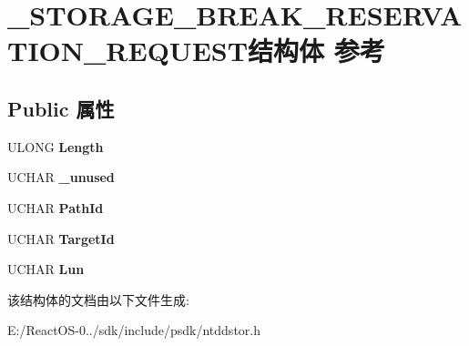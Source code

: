 \hypertarget{struct___s_t_o_r_a_g_e___b_r_e_a_k___r_e_s_e_r_v_a_t_i_o_n___r_e_q_u_e_s_t}{}\section{\+\_\+\+S\+T\+O\+R\+A\+G\+E\+\_\+\+B\+R\+E\+A\+K\+\_\+\+R\+E\+S\+E\+R\+V\+A\+T\+I\+O\+N\+\_\+\+R\+E\+Q\+U\+E\+S\+T结构体 参考}
\label{struct___s_t_o_r_a_g_e___b_r_e_a_k___r_e_s_e_r_v_a_t_i_o_n___r_e_q_u_e_s_t}
\subsection*{Public 属性}
\begin{DoxyCompactItemize}
\item 
\mbox{\label{struct___s_t_o_r_a_g_e___b_r_e_a_k___r_e_s_e_r_v_a_t_i_o_n___r_e_q_u_e_s_t_a73fdee5af86956c812d6cf01e4f4e825}} 
U\+L\+O\+NG {\bfseries Length}
\item 
\mbox{\label{struct___s_t_o_r_a_g_e___b_r_e_a_k___r_e_s_e_r_v_a_t_i_o_n___r_e_q_u_e_s_t_aef04a947c50e5e9fd005708970862bb2}} 
U\+C\+H\+AR {\bfseries \+\_\+unused}
\item 
\mbox{\label{struct___s_t_o_r_a_g_e___b_r_e_a_k___r_e_s_e_r_v_a_t_i_o_n___r_e_q_u_e_s_t_a59a789d1ec44caf17e56eb0f9841a06e}} 
U\+C\+H\+AR {\bfseries Path\+Id}
\item 
\mbox{\label{struct___s_t_o_r_a_g_e___b_r_e_a_k___r_e_s_e_r_v_a_t_i_o_n___r_e_q_u_e_s_t_a088187b924dd762d2aaa3ac984600bd5}} 
U\+C\+H\+AR {\bfseries Target\+Id}
\item 
\mbox{\label{struct___s_t_o_r_a_g_e___b_r_e_a_k___r_e_s_e_r_v_a_t_i_o_n___r_e_q_u_e_s_t_a6efa58e993ab105fdefe9b3ca9e950fe}} 
U\+C\+H\+AR {\bfseries Lun}
\end{DoxyCompactItemize}


该结构体的文档由以下文件生成\+:\begin{DoxyCompactItemize}
\item 
E\+:/\+React\+O\+S-\/0../sdk/include/psdk/ntddstor.\+h\end{DoxyCompactItemize}
